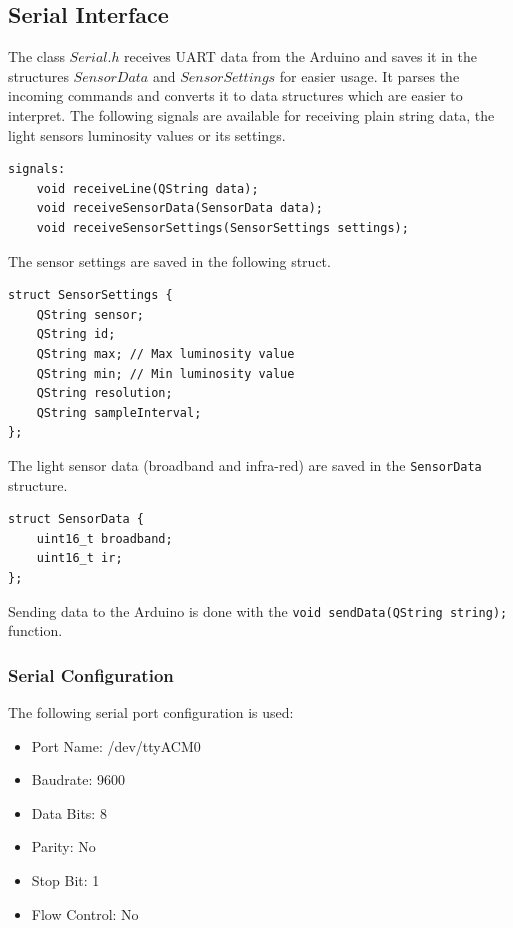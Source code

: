 \documentclass[notitlepage]{scrreprt}
\begin{document}
\subsection{Serial Interface}
The class $Serial.h$ receives UART data from the Arduino and saves it in the structures $SensorData$ and $SensorSettings$ for easier usage. It parses the incoming commands and converts it to data structures which are easier to interpret. The following signals are available for receiving plain string data, the light sensors luminosity values or its settings.

\begin{lstlisting}
signals:
    void receiveLine(QString data);
    void receiveSensorData(SensorData data);
    void receiveSensorSettings(SensorSettings settings);
\end{lstlisting}

The sensor settings are saved in the following struct.

\begin{lstlisting}
struct SensorSettings {
    QString sensor;
    QString id;
    QString max; // Max luminosity value
    QString min; // Min luminosity value
    QString resolution;
    QString sampleInterval;
};
\end{lstlisting}

The light sensor data (broadband and infra-red) are saved in the \lstinline{SensorData} structure.

\begin{lstlisting}
struct SensorData {
	uint16_t broadband;
	uint16_t ir;
};
\end{lstlisting}

Sending data to the Arduino is done with the \lstinline{void sendData(QString string);} function.

\subsubsection{Serial Configuration}
The following serial port configuration is used:
\begin{itemize}
	\item{Port Name: /dev/ttyACM0}
	\item{Baudrate: 9600}
	\item{Data Bits: 8}
	\item{Parity: No}
	\item{Stop Bit: 1}
	\item{Flow Control: No}
\end{itemize}
\end{document}
